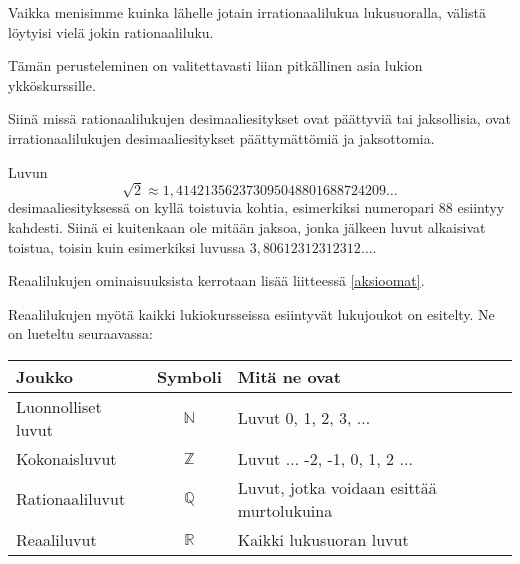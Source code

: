 Vaikka menisimme kuinka lähelle jotain irrationaalilukua lukusuoralla, välistä löytyisi vielä jokin rationaaliluku.



Tämän perusteleminen on valitettavasti liian pitkällinen asia lukion ykköskurssille.


Siinä missä rationaalilukujen desimaaliesitykset ovat päättyviä tai jaksollisia, ovat irrationaalilukujen desimaaliesitykset päättymättömiä ja
jaksottomia.

Luvun
\[\sqrt{2} \approx 1,414213562373095048801688724209\ldots\]
desimaaliesityksessä on kyllä toistuvia kohtia, esimerkiksi numeropari $88$ esiintyy kahdesti. Siinä ei kuitenkaan ole mitään jaksoa, jonka jälkeen luvut alkaisivat toistua, toisin kuin esimerkiksi luvussa $3,80612312312312\ldots$.

Reaalilukujen ominaisuuksista kerrotaan lisää liitteessä \ref{aksioomat}.


Reaalilukujen myötä kaikki lukiokursseissa esiintyvät lukujoukot on esitelty. Ne on lueteltu seuraavassa:
\begin{center}\begin{tabular}{l|c|l}
Joukko & Symboli & Mitä ne ovat\\
\hline
Luonnolliset luvut & $\mathbb{N}$ &
Luvut 0, 1, 2, 3, $\ldots$ \\
Kokonaisluvut & $\mathbb{Z}$ & Luvut $\ldots$ -2, -1, 0, 1, 2 $\ldots$ \\
Rationaaliluvut & $\mathbb{Q}$ & Luvut, jotka voidaan esittää
murtolukuina \\
Reaaliluvut & $\mathbb{R}$ & Kaikki lukusuoran luvut
\end{tabular} \end{center} 


